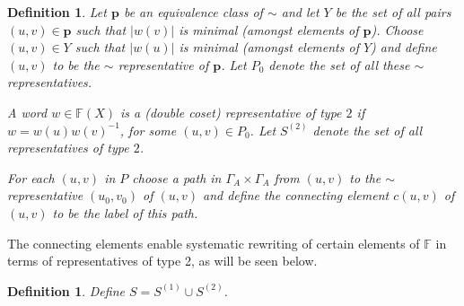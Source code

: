 \documentclass[a4paper,12pt]{article}
\newcommand{\G}{\Gamma }
\newcommand{\pp}{\mathbf{p}}
\newtheorem{definition}[theorem]{Definition}
\numberwithin{equation}{section}
\numberwithin{figure}{section}
\newcommand{\FF}{\ensuremath{\mathbb{F}}}
\begin{document}
\begin{definition}\label{def:repres_t2}
Let $\pp$ be an equivalence class of $\sim$ and let $Y$ be the set
of all pairs $(u,v)\in \pp$ such that $|w(v)|$ is minimal (amongst
elements of $\pp$). Choose $(u,v)\in Y$ such that $|w(u)|$ is
minimal (amongst elements of $Y$) and define $(u,v)$ to be the
$\sim$ {\em representative} of
$\pp$. %
Let $P_0$ denote the set of  all these $\sim$
representatives.

A word $w\in \FF(X)$ is
 a {\em (double coset) representative of type} $2$
if $w=w(u)w(v)^{-1}$, for some $(u,v)\in P_0$.
Let $S^{(2)}$ denote the set of all representatives of type $2$.

For each $(u,v)$ in $P$ choose a path in $\G_A\times \G_A$
from $(u,v)$ to the $\sim$ representative
$(u_0,v_0)$ of $(u,v)$ and define the {\em connecting element}
$c(u,v)$  of $(u,v)$ to be the label of this path.
\end{definition}
The  connecting elements enable systematic rewriting of certain
elements of $\FF$ in terms of representatives of type 2, as will be
seen below.
\begin{definition}
Define $S=S^{(1)}\cup S^{(2)}$.
\end{definition}
\end{document}
